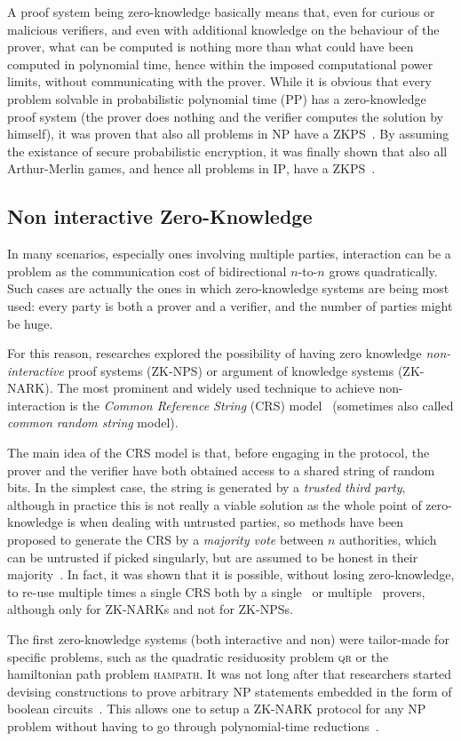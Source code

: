 A proof system being zero-knowledge basically means that, even for curious or malicious verifiers,
and even with additional knowledge on the behaviour of the prover, what can be computed is nothing 
more than what could have been computed in polynomial time, hence within the imposed computational 
power limits, without communicating with the prover.
While it is obvious that every problem solvable in probabilistic polynomial time 
(\textsc{PP}) has a zero-knowledge proof system (the prover does nothing and the verifier computes 
the solution by himself), it was proven that also all problems in \textsc{NP} have a 
ZKPS~\cite{GoldreichMW1991}. 
By assuming the existance of secure probabilistic encryption, it was finally shown that also 
all Arthur-Merlin games, and hence all problems in \textsc{IP}, have a ZKPS~\cite{BenorGGHKMR1990}.

\subsection{Non interactive Zero-Knowledge}
In many scenarios, especially ones involving multiple parties, interaction can be a problem as
the communication cost of bidirectional \(n\)-to-\(n\) grows quadratically.
Such cases are actually the ones in which zero-knowledge systems are being most used: every party
is both a prover and a verifier, and the number of parties might be huge.

For this reason, researches explored the possibility of having zero 
knowledge \emph{non-interactive} proof systems (ZK-NPS) or argument of knowledge systems (ZK-NARK).
The most prominent and widely used technique to achieve non-interaction is the 
\emph{Common Reference String} (CRS) model~\cite{BlumFM1988} (sometimes also called 
\emph{common random string} model).

The main idea of the CRS model is that, before engaging in the protocol, the prover and 
the verifier have both obtained access to a shared string of random bits. 
In the simplest case, the string is generated by a \emph{trusted third party}, although in 
practice this is not really a viable solution as the whole point of zero-knowledge is when dealing 
with untrusted parties, so methods have been proposed to generate the CRS by a \emph{majority vote}
between \(n\) authorities, which can be untrusted if picked singularly, but are assumed to be 
honest in their majority~\cite{GrothO2006}.
In fact, it was shown that it is possible, without losing zero-knowledge, to re-use multiple times 
a single CRS both by a single~\cite{BlumSMP1991} or multiple~\cite{FeigeLS1990} provers, although 
only for ZK-NARKs and not for ZK-NPSs.

The first zero-knowledge systems (both interactive and non) were tailor-made for specific 
problems, such as the quadratic residuosity problem \textsc{qr} or the hamiltonian path problem 
\textsc{hampath}.
It was not long after that researchers started devising constructions to prove arbitrary NP 
statements embedded in the form of boolean circuits~\cite{Damgard1993}.
This allows one to setup a ZK-NARK protocol for any NP problem without having to go through 
polynomial-time reductions~\cite{Sipser2013}. 
